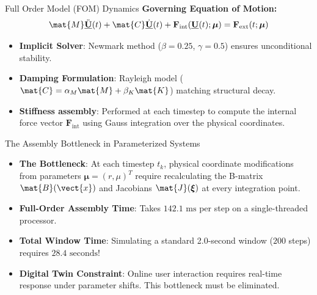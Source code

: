 \begin{frame}{Full Order Model (FOM) Dynamics}
    \textbf{Governing Equation of Motion:}
    \begin{equation*}
        \mat{M} \ddot{\underline{\mathbf{U}}}(t) + \mat{C} \dot{\underline{\mathbf{U}}}(t) + \mathbf{F}_{\text{int}}(\underline{\mathbf{U}}(t); \boldsymbol{\mu}) = \mathbf{F}_{\text{ext}}(t; \boldsymbol{\mu})
    \end{equation*}
    \begin{itemize}
        \item \textbf{Implicit Solver}: Newmark method ($\beta = 0.25$, $\gamma = 0.5$) ensures unconditional stability.
        \item \textbf{Damping Formulation}: Rayleigh model ($\mat{C} = \alpha_M \mat{M} + \beta_K \mat{K}$) matching structural decay.
        \item \textbf{Stiffness assembly}: Performed at each timestep to compute the internal force vector $\mathbf{F}_{\text{int}}$ using Gauss integration over the physical coordinates.
    \end{itemize}
\end{frame}

\begin{frame}{The Assembly Bottleneck in Parameterized Systems}
    \begin{itemize}
        \item \textbf{The Bottleneck}: At each timestep $t_k$, physical coordinate modifications from parameters $\boldsymbol{\mu} = (r, \mu)^T$ require recalculating the B-matrix $\mat{B}(\vect{x})$ and Jacobians $\mat{J}(\boldsymbol{\xi})$ at every integration point.
        \item \textbf{Full-Order Assembly Time}: Takes \textbf{$142.1\text{ ms}$} per step on a single-threaded processor.
        \item \textbf{Total Window Time}: Simulating a standard 2.0-second window ($200$ steps) requires \textbf{$28.4\text{ seconds}$}!
        \item \textbf{Digital Twin Constraint}: Online user interaction requires real-time response under parameter shifts. This bottleneck must be eliminated.
    \end{itemize}
\end{frame}
